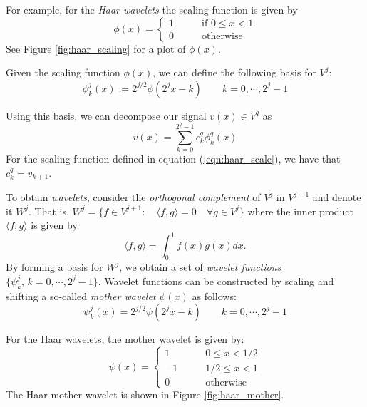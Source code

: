 For example, for the \emph{Haar wavelets} the scaling function is given by
\begin{equation}
  \label{eqn:haar_scale}
  \phi(x) = \left\{ \begin{array}{rl}
    1& \qquad \mbox{if $0\leq x < 1$}\\
    0& \qquad \mbox{otherwise}
  \end{array}\right.
\end{equation}
See Figure \ref{fig:haar_scaling} for a plot of $\phi(x)$.

Given the scaling function $\phi(x)$, we can define the following basis for $V^j$:
\begin{equation}
  \label{eqn:haar_scaling_basis}
  \phi_k^j(x) := 2^{j/2}\phi(2^j x-k) \qquad k = 0,\cdots, 2^j-1
\end{equation}

Using this basis, we can decompose our signal $v(x)\in V^q$ as 
\begin{equation*}
  v(x) = \sum_{k=0}^{2^q-1} c_k^q \phi_k^q(x)
\end{equation*}
For the scaling function defined in equation (\ref{eqn:haar_scale}), we have that $c_k^q = v_{k+1}$.

To obtain \emph{wavelets}, consider the \emph{orthogonal complement} of $V^j$ in $V^{j+1}$ and denote it $W^j$. 
That is, $W^j = \{f \in V^{j+1} :\quad \langle f,g\rangle = 0\quad \forall g \in V^j\}$ where the inner product $\langle f,g\rangle$ is given by
\begin{equation*}
  \langle f,g\rangle = \int_0^1f(x)g(x)dx.
\end{equation*}
By forming a basis for $W^j$, we obtain a set of \emph{wavelet functions} $\{\psi_k^j,\, k=0,\cdots,2^j-1\}$.
Wavelet functions can be constructed by scaling and shifting a so-called \emph{mother wavelet} $\psi(x)$ as follows:
\begin{equation}
  \label{eqn:haar_wavelet_basis}
  \psi_k^j(x) = 2^{j/2}\psi(2^j x - k) \qquad k = 0,\cdots, 2^j-1
\end{equation}

For the Haar wavelets, the mother wavelet is given by:
\begin{equation}
\label{eqn:haar_mother}
  \psi(x) = \left\{\begin{array}{rl}
  1&\qquad 0 \leq x < 1/2\\
  -1&\qquad 1/2 \leq x < 1\\
  0&\qquad\mbox{otherwise}
  \end{array}\right.
\end{equation}
The Haar mother wavelet is shown in Figure \ref{fig:haar_mother}.

